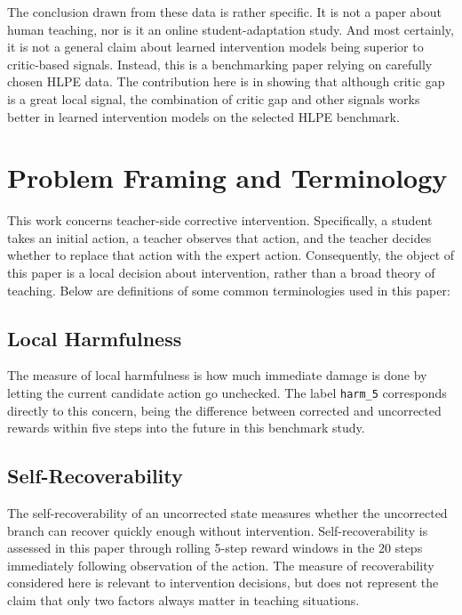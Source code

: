 \documentclass[11pt]{article}
\begin{document}
The conclusion drawn from these data is rather specific. It is not a paper about human teaching, nor is it an online student-adaptation study. And most certainly, it is not a general claim about learned intervention models being superior to critic-based signals. Instead, this is a benchmarking paper relying on carefully chosen HLPE data. The contribution here is in showing that although critic gap is a great local signal, the combination of critic gap and other signals works better in learned intervention models on the selected HLPE benchmark.

\section{Problem Framing and Terminology}

This work concerns teacher-side corrective intervention. Specifically, a student takes an initial action, a teacher observes that action, and the teacher decides whether to replace that action with the expert action. Consequently, the object of this paper is a local decision about intervention, rather than a broad theory of teaching. Below are definitions of some common terminologies used in this paper:

\subsection*{Local Harmfulness}

The measure of local harmfulness is how much immediate damage is done by letting the current candidate action go unchecked. The label \texttt{harm\_5} corresponds directly to this concern, being the difference between corrected and uncorrected rewards within five steps into the future in this benchmark study.

\subsection*{Self-Recoverability}

The self-recoverability of an uncorrected state measures whether the uncorrected branch can recover quickly enough without intervention. Self-recoverability is assessed in this paper through rolling 5-step reward windows in the 20 steps immediately following observation of the action. The measure of recoverability considered here is relevant to intervention decisions, but does not represent the claim that only two factors always matter in teaching situations.
\end{document}
